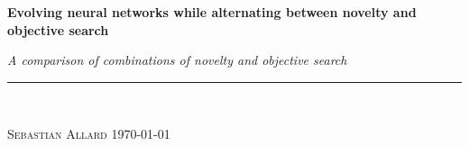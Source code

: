 
\vspace*{5cm}

\begin{flushleft}
\Huge \textsf{\textbf{Evolving neural networks while alternating between novelty and objective search}}
\end{flushleft}

\emph{\large A comparison of combinations of novelty and objective search} \hfill \\
\rule{\textwidth}{1pt} \\

\begin{flushright}
\textsc{Sebastian Allard} \quad \today
\end{flushright}


\thispagestyle{empty}
